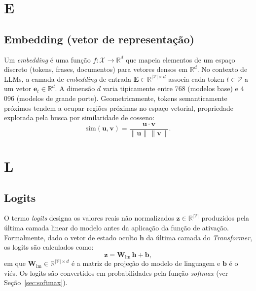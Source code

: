 \section*{E}

\subsection*{Embedding (vetor de representação)}
\label{sec:embedding}

Um \textit{embedding} é uma função $f: \mathcal{X} \to \mathbb{R}^d$ que
mapeia elementos de um espaço discreto (tokens, frases, documentos) para
vetores densos em $\mathbb{R}^d$. No contexto de LLMs, a camada de
\textit{embedding} de entrada $\mathbf{E} \in \mathbb{R}^{|\mathcal{V}| \times d}$
associa cada token $t \in \mathcal{V}$ a um vetor $\mathbf{e}_t \in \mathbb{R}^d$.
A dimensão $d$ varia tipicamente entre 768 (modelos base) e 4\,096 (modelos
de grande porte). Geometricamente, tokens semanticamente próximos tendem a
ocupar regiões próximas no espaço vetorial, propriedade explorada pela busca
por similaridade de cosseno:
\[
  \text{sim}(\mathbf{u}, \mathbf{v}) = \frac{\mathbf{u} \cdot \mathbf{v}}
  {\|\mathbf{u}\| \, \|\mathbf{v}\|}.
\]

\section*{L}

\subsection*{Logits}
\label{sec:logits}

O termo \textit{logits} designa os valores reais não normalizados $\mathbf{z} \in \mathbb{R}^{|\mathcal{V}|}$
produzidos pela última camada linear do modelo antes da aplicação da função
de ativação. Formalmente, dado o vetor de estado oculto $\mathbf{h}$ da última
camada do \textit{Transformer}, os logits são calculados como:
\[
  \mathbf{z} = \mathbf{W}_\text{lm}\,\mathbf{h} + \mathbf{b},
\]
em que $\mathbf{W}_\text{lm} \in \mathbb{R}^{|\mathcal{V}| \times d}$ é a
matriz de projeção do modelo de linguagem e $\mathbf{b}$ é o viés. Os logits
são convertidos em probabilidades pela função \textit{softmax}
(ver Seção~\ref{sec:softmax}).

